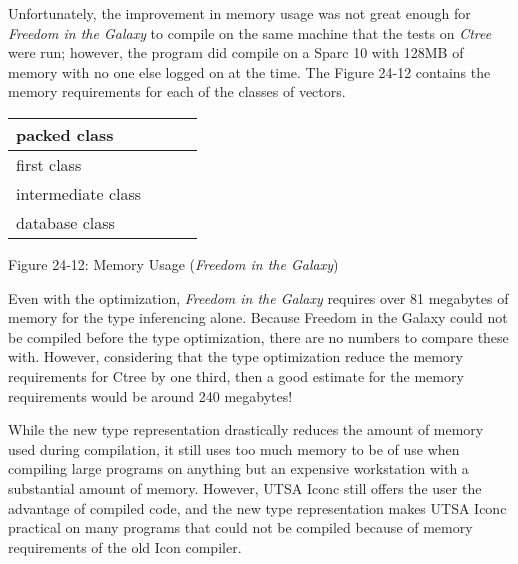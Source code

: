 Unfortunately, the improvement in memory usage was not great enough
for \textit{Freedom in the Galaxy} to compile on the same machine that
the tests on \textit{Ctree} were run; however, the program did compile
on a Sparc 10 with 128MB of memory with no one else logged on at the
time. The Figure 24-12 contains the memory requirements for each of
the classes of vectors.

\begin{center}
\tabletail{}
\tablelasttail{}
\begin{xtabular}{|m{1.2288599in}|m{1.2170599in}|m{1.2427598in}|m{1.6538599in}|}
\hline
 packed class &
 &
 &
\raggedleft{}\\\hline
 first class &
 &
 &
\raggedleft{}\\\hline
 intermediate class &
 &
 &
\raggedleft{}\\\hline
 database class &
 &
 &
\raggedleft{}\\\hline
\end{xtabular}
\end{center}
{\centering{}
Figure 24-12: Memory Usage (\textit{Freedom in the Galaxy})
\par}


Even with the optimization, \textit{Freedom in the Galaxy} requires
over 81 megabytes of memory for the type inferencing alone. Because
Freedom in the Galaxy could not be compiled before the type
optimization, there are no numbers to compare these with. However,
considering that the type optimization reduce the memory requirements
for Ctree by one third, then a good estimate for the memory
requirements would be around 240 megabytes!

While the new type representation drastically reduces the amount of
memory used during compilation, it still uses too much memory to be of
use when compiling large programs on anything but an expensive
workstation with a substantial amount of memory. However, UTSA Iconc
still offers the user the advantage of compiled code, and the new type
representation makes UTSA Iconc practical on many programs that could
not be compiled because of memory requirements of the old Icon
compiler.

